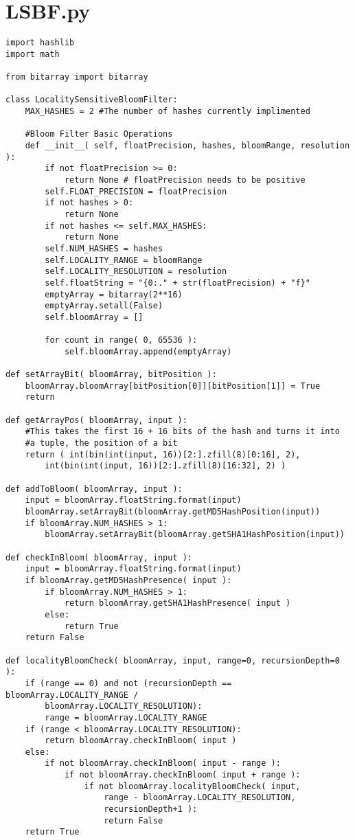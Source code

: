 \chapter{LSBF.py}
\label{appendix:A}

\lstset{language=Python, tabsize=3}
\begin{lstlisting}
import hashlib
import math

from bitarray import bitarray

class LocalitySensitiveBloomFilter:
	MAX_HASHES = 2 #The number of hashes currently implimented

	#Bloom Filter Basic Operations
	def __init__( self, floatPrecision, hashes,	bloomRange, resolution ):
		if not floatPrecision >= 0:
			return None # floatPrecision needs to be positive
		self.FLOAT_PRECISION = floatPrecision
		if not hashes > 0:
			return None
		if not hashes <= self.MAX_HASHES:
			return None
		self.NUM_HASHES = hashes
		self.LOCALITY_RANGE = bloomRange
		self.LOCALITY_RESOLUTION = resolution
		self.floatString = "{0:." + str(floatPrecision) + "f}"
		emptyArray = bitarray(2**16)
		emptyArray.setall(False)
		self.bloomArray = []

		for count in range( 0, 65536 ):
			self.bloomArray.append(emptyArray)

def setArrayBit( bloomArray, bitPosition ):
	bloomArray.bloomArray[bitPosition[0]][bitPosition[1]] = True
	return

def getArrayPos( bloomArray, input ):
	#This takes the first 16 + 16 bits of the hash and turns it into
	#a tuple, the position of a bit
	return ( int(bin(int(input, 16))[2:].zfill(8)[0:16], 2),
		int(bin(int(input, 16))[2:].zfill(8)[16:32], 2) )

def addToBloom( bloomArray, input ):
	input = bloomArray.floatString.format(input)
	bloomArray.setArrayBit(bloomArray.getMD5HashPosition(input))
	if bloomArray.NUM_HASHES > 1:
		bloomArray.setArrayBit(bloomArray.getSHA1HashPosition(input))

def checkInBloom( bloomArray, input ):
	input = bloomArray.floatString.format(input)
	if bloomArray.getMD5HashPresence( input ):
		if bloomArray.NUM_HASHES > 1:
			return bloomArray.getSHA1HashPresence( input )
		else:
			return True
	return False

def localityBloomCheck( bloomArray, input, range=0, recursionDepth=0 ):
	if (range == 0) and not (recursionDepth == bloomArray.LOCALITY_RANGE / 
		bloomArray.LOCALITY_RESOLUTION):
		range = bloomArray.LOCALITY_RANGE
	if (range < bloomArray.LOCALITY_RESOLUTION):
		return bloomArray.checkInBloom( input )
	else:
		if not bloomArray.checkInBloom( input - range ):
			if not bloomArray.checkInBloom( input + range ):
				if not bloomArray.localityBloomCheck( input,
					range - bloomArray.LOCALITY_RESOLUTION,
					recursionDepth+1 ):
					return False
	return True


\end{lstlisting}
